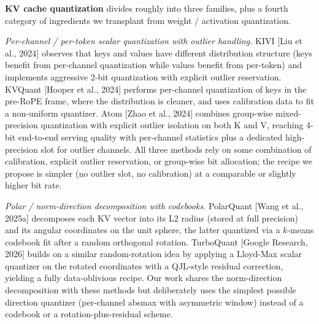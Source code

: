 \textbf{KV cache quantization} divides roughly into three families, plus
a fourth category of ingredients we transplant from weight / activation
quantization.

\emph{Per-channel / per-token scalar quantization with outlier
handling.} KIVI {[}Liu et al., 2024{]} observes that keys and values
have different distribution structure (keys benefit from per-channel
quantization while values benefit from per-token) and implements
aggressive 2-bit quantization with explicit outlier reservation. KVQuant
{[}Hooper et al., 2024{]} performs per-channel quantization of keys in
the pre-RoPE frame, where the distribution is cleaner, and uses
calibration data to fit a non-uniform quantizer. Atom {[}Zhao et al.,
2024{]} combines group-wise mixed-precision quantization with explicit
outlier isolation on both K and V, reaching 4-bit end-to-end serving
quality with per-channel statistics plus a dedicated high-precision slot
for outlier channels. All three methods rely on some combination of
calibration, explicit outlier reservation, or group-wise bit allocation;
the recipe we propose is simpler (no outlier slot, no calibration) at a
comparable or slightly higher bit rate.

\emph{Polar / norm-direction decomposition with codebooks.} PolarQuant
{[}Wang et al., 2025a{]} decomposes each KV vector into its L2 radius
(stored at full precision) and its angular coordinates on the unit
sphere, the latter quantized via a \(k\)-means codebook fit after a
random orthogonal rotation. TurboQuant {[}Google Research, 2026{]}
builds on a similar random-rotation idea by applying a Lloyd-Max scalar
quantizer on the rotated coordinates with a QJL-style residual
correction, yielding a fully data-oblivious recipe. Our work shares the
norm-direction decomposition with these methods but deliberately uses
the simplest possible direction quantizer (per-channel absmax with
asymmetric window) instead of a codebook or a rotation-plus-residual
scheme.

